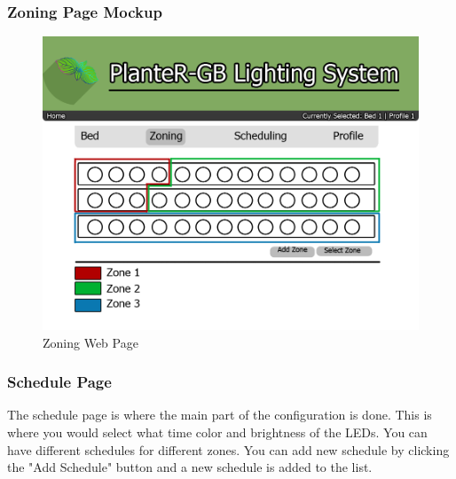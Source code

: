 			            \subsubsection{Zoning Page Mockup}
			            \begin{center}
			                \begin{figure}[H]
			                    \includegraphics[width=\linewidth]{web_design/ZoningPage.png}
			                    \caption{Zoning Web Page}
			                    \label{fig:Zoning Page}
			                \end{figure}
			            \end{center}
			            \subsubsection{Schedule Page}
			            The schedule page is where the main part of the configuration is done.
			            This is where you would select what time color and brightness of the LEDs.
			            You can have different schedules for different zones. You can add new schedule
			            by clicking the "Add Schedule" button and a new schedule is added to the
			            list.
